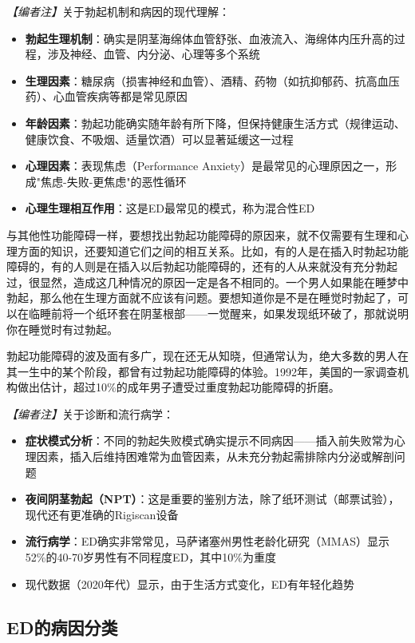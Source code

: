 \noindent\textit{【编者注】}关于勃起机制和病因的现代理解：
\begin{itemize}
	\item \textbf{勃起生理机制}：确实是阴茎海绵体血管舒张、血液流入、海绵体内压升高的过程，涉及神经、血管、内分泌、心理等多个系统
	\item \textbf{生理因素}：糖尿病（损害神经和血管）、酒精、药物（如抗抑郁药、抗高血压药）、心血管疾病等都是常见原因
	\item \textbf{年龄因素}：勃起功能确实随年龄有所下降，但保持健康生活方式（规律运动、健康饮食、不吸烟、适量饮酒）可以显著延缓这一过程
	\item \textbf{心理因素}：表现焦虑（Performance Anxiety）是最常见的心理原因之一，形成"焦虑-失败-更焦虑"的恶性循环
	\item \textbf{心理生理相互作用}：这是ED最常见的模式，称为混合性ED
\end{itemize}

与其他性功能障碍一样，要想找出勃起功能障碍的原因来，就不仅需要有生理和心理方面的知识，还要知道它们之间的相互关系。比如，有的人是在插入时勃起功能障碍的，有的人则是在插入以后勃起功能障碍的，还有的人从来就没有充分勃起过，很显然，造成这几种情况的原因一定是各不相同的。一个男人如果能在睡梦中勃起，那么他在生理方面就不应该有问题。要想知道你是不是在睡觉时勃起了，可以在临睡前将一个纸环套在阴茎根部——一觉醒来，如果发现纸环破了，那就说明你在睡觉时有过勃起。

勃起功能障碍的波及面有多广，现在还无从知晓，但通常认为，绝大多数的男人在其一生中的某个阶段，都曾有过勃起功能障碍的体验。1992年，美国的一家调查机构做出估计，超过10\%的成年男子遭受过重度勃起功能障碍的折磨。

\noindent\textit{【编者注】}关于诊断和流行病学：
\begin{itemize}
	\item \textbf{症状模式分析}：不同的勃起失败模式确实提示不同病因——插入前失败常为心理因素，插入后维持困难常为血管因素，从未充分勃起需排除内分泌或解剖问题
	\item \textbf{夜间阴茎勃起（NPT）}：这是重要的鉴别方法，除了纸环测试（邮票试验），现代还有更准确的Rigiscan设备
	\item \textbf{流行病学}：ED确实非常常见，马萨诸塞州男性老龄化研究（MMAS）显示52\%的40-70岁男性有不同程度ED，其中10\%为重度
	\item 现代数据（2020年代）显示，由于生活方式变化，ED有年轻化趋势
\end{itemize}

\subsection{ED的病因分类}

